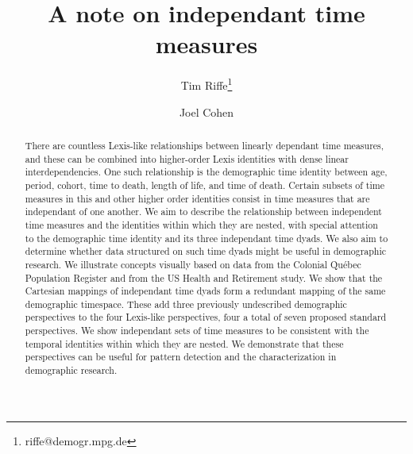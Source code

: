 


\title{A note on independant time measures}

\author[1]{Tim Riffe\thanks{riffe@demogr.mpg.de}}
\author[2]{Joel Cohen}





\maketitle

\vspace{-2em}
\begin{abstract}
 There are countless Lexis-like relationships between
linearly dependant time measures, and these can be combined into higher-order
Lexis identities with dense linear interdependencies. One such relationship is
the demographic time identity between age, period, cohort, time to death, length of life, and time of death. Certain subsets of time measures in this
and other higher order identities consist in time measures that are independant
of one another.
 We aim to describe the relationship between
independent time measures and the identities within which they are nested, with
special attention to the demographic time identity and its three independant
time dyads. We also aim to determine whether data structured on such time dyads
might be useful in demographic research.
 We illustrate concepts visually based on data from the
Colonial Qu\'{e}bec Population Register and from the US Health and Retirement study.
  We show that the Cartesian mappings of independant time dyads form a redundant mapping of the same demographic timespace. These add three previously undescribed demographic perspectives to the four Lexis-like perspectives, four a total of seven proposed standard perspectives. 
 We show independant sets of time measures to be consistent
with the temporal identities within which they are nested. We demonstrate that
these perspectives can be useful for pattern detection and the characterization
in demographic research.
\end{abstract}

